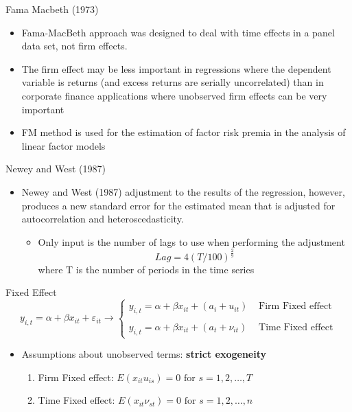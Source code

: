 \documentclass{beamer}
\begin{document}
\begin{frame}{Fama Macbeth (1973)}
\begin{itemize}
\item Fama-MacBeth approach was designed to deal with time effects in a panel data set,
not firm effects.

\item The firm effect may be less important in regressions where the dependent variable is returns
(and excess returns are serially uncorrelated) than in corporate finance applications where
unobserved firm effects can be very important

\item FM method is used for the estimation of factor risk premia in the analysis of linear factor models
\end{itemize}
\end{frame}

\begin{frame}{Newey and West (1987)}
\begin{itemize}
\item Newey and West (1987) adjustment to the results of the
regression, however, produces a new standard error for the estimated mean that is
adjusted for autocorrelation and heteroscedasticity.
\begin{itemize}
\item Only input is the number of lags to use when performing the adjustment
\begin{equation*}
Lag = 4(T/100)^{\frac{2}{9}}
\end{equation*}
where T is the number of periods in the time series
\end{itemize}
\end{itemize}
\end{frame}

\begin{frame}{Fixed Effect}
\begin{equation*}
y_{i,t} = \alpha + \beta x_{it} + \varepsilon_{it} \rightarrow \left\{
\begin{array}{lr}
y_{i,t} = \alpha + \beta x_{it} + (a_i + u_{it}) & \text{ Firm Fixed effect}\\\\
y_{i,t} = \alpha + \beta x_{it} + (a_t + \nu_{it}) & \text{ Time Fixed effect}
\end{array}
\right.
\end{equation*}

\begin{itemize}
\item Assumptions about unobserved terms: \textbf{strict exogeneity}
\begin{enumerate}
\item Firm Fixed effect:
$ E(x_{it}u_{is}) = 0 \text{ for } s = 1, 2, \dots , T $
\item Time Fixed effect:
$ E(x_{it}\nu_{st}) = 0 \text{ for } s = 1, 2, \dots , n $
\end{enumerate}

\end{itemize}
\end{frame}
\end{document}
